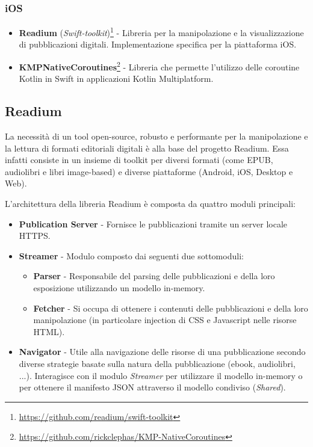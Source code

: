 \subsubsection*{iOS}
\begin{itemize}
    \item \textbf{Readium} (\textit{Swift-toolkit})\footnote{\href{https://github.com/readium/swift-toolkit}{https://github.com/readium/swift-toolkit}} - Libreria per la manipolazione e la visualizzazione di pubblicazioni digitali. Implementazione specifica per la piattaforma iOS. 
    \item \textbf{KMPNativeCoroutines}\footnote{\href{https://github.com/rickclephas/KMP-NativeCoroutines}{https://github.com/rickclephas/KMP-NativeCoroutines}} - Libreria che permette l'utilizzo delle coroutine Kotlin in Swift in applicazioni Kotlin Multiplatform.
\end{itemize}
    
\subsection{Readium}
La necessità di un tool open-source, robusto e performante per la manipolazione e la lettura di formati editoriali digitali è alla base del progetto Readium. Essa infatti consiste in un insieme di toolkit per diversi formati (come EPUB, audiolibri e libri image-based) e diverse piattaforme (Android, iOS, Desktop e Web).

L'architettura della libreria Readium è composta da quattro moduli principali:
\begin{itemize}
    \item \textbf{Publication Server} - Fornisce le pubblicazioni tramite un server locale HTTPS.
    \item \textbf{Streamer} - Modulo composto dai seguenti due sottomoduli:
    \begin{itemize}
        \item \textbf{Parser} - Responsabile del parsing delle pubblicazioni e della loro esposizione utilizzando un modello in-memory.
        \item \textbf{Fetcher} - Si occupa di ottenere i contenuti delle pubblicazioni e della loro manipolazione (in particolare injection di CSS e Javascript nelle risorse HTML).
    \end{itemize}
    \item \textbf{Navigator} - Utile alla navigazione delle risorse di una pubblicazione secondo diverse strategie basate sulla natura della pubblicazione (ebook, audiolibri, ...). Interagisce con il modulo \textit{Streamer} per utilizzare il modello in-memory o per ottenere il manifesto JSON attraverso il modello condiviso (\textit{Shared}).
\end{itemize}

